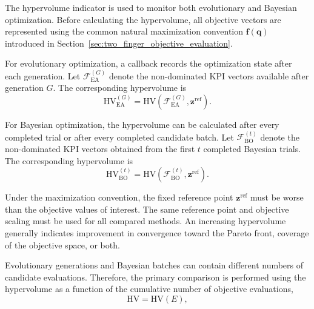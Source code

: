 The hypervolume indicator is used to monitor both evolutionary and Bayesian optimization. Before
calculating the hypervolume, all objective vectors are represented using the common natural
maximization convention $\mathbf{f}(\mathbf{q})$ introduced in
Section~\ref{sec:two_finger_objective_evaluation}.

For evolutionary optimization, a callback records the optimization state after each generation. Let
$\mathcal{F}_{\mathrm{EA}}^{(G)}$ denote the non-dominated KPI vectors available after generation
$G$. The corresponding hypervolume is
\begin{equation}
    \mathrm{HV}_{\mathrm{EA}}^{(G)}
    =
    \mathrm{HV}
    \left(
        \mathcal{F}_{\mathrm{EA}}^{(G)},
        \mathbf{z}^{\mathrm{ref}}
    \right).
\end{equation}

For Bayesian optimization, the hypervolume can be calculated after every completed trial or after
every completed candidate batch. Let $\mathcal{F}_{\mathrm{BO}}^{(t)}$ denote the non-dominated KPI
vectors obtained from the first $t$ completed Bayesian trials. The corresponding hypervolume is
\begin{equation}
    \mathrm{HV}_{\mathrm{BO}}^{(t)}
    =
    \mathrm{HV}
    \left(
        \mathcal{F}_{\mathrm{BO}}^{(t)},
        \mathbf{z}^{\mathrm{ref}}
    \right).
\end{equation}

Under the maximization convention, the fixed reference point $\mathbf{z}^{\mathrm{ref}}$ must be
worse than the objective values of interest. The same reference point and objective scaling must be
used for all compared methods. An increasing hypervolume generally indicates improvement in
convergence toward the Pareto front, coverage of the objective space, or both.

Evolutionary generations and Bayesian batches can contain different numbers of candidate
evaluations. Therefore, the primary comparison is performed using the hypervolume as a function of
the cumulative number of objective evaluations,
\begin{equation}
    \mathrm{HV} = \mathrm{HV}(E),
\end{equation}

